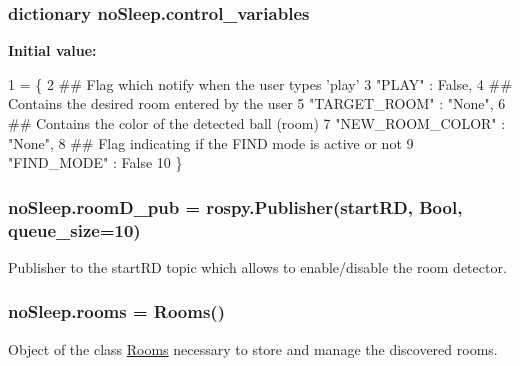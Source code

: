 \subsubsection[{\texorpdfstring{control\+\_\+variables}{control_variables}}]{\setlength{\rightskip}{0pt plus 5cm}dictionary no\+Sleep.\+control\+\_\+variables}\hypertarget{namespacenoSleep_adbe81123b7abf75f19b461e802380fc1}{}\label{namespacenoSleep_adbe81123b7abf75f19b461e802380fc1}
{\bfseries Initial value\+:}
\begin{DoxyCode}
1 = \{
2     \textcolor{comment}{## Flag which notify when the user types 'play'}
3     \textcolor{stringliteral}{"PLAY"} : \textcolor{keyword}{False},
4     \textcolor{comment}{## Contains the desired room entered by the user }
5     \textcolor{stringliteral}{"TARGET\_ROOM"} : \textcolor{stringliteral}{"None"},
6     \textcolor{comment}{## Contains the color of the detected ball (room) }
7     \textcolor{stringliteral}{"NEW\_ROOM\_COLOR"} : \textcolor{stringliteral}{"None"},
8     \textcolor{comment}{## Flag indicating if the FIND mode is active or not }
9     \textcolor{stringliteral}{"FIND\_MODE"} : \textcolor{keyword}{False}   
10 \}
\end{DoxyCode}
\subsubsection[{\texorpdfstring{room\+D\+\_\+pub}{roomD_pub}}]{\setlength{\rightskip}{0pt plus 5cm}no\+Sleep.\+room\+D\+\_\+pub = rospy.\+Publisher(\textquotesingle{}start\+RD\textquotesingle{}, Bool, queue\+\_\+size=10)}\hypertarget{namespacenoSleep_a9556e14c4f96e9bd3a98d6313f1c971b}{}\label{namespacenoSleep_a9556e14c4f96e9bd3a98d6313f1c971b}


Publisher to the start\+RD topic which allows to enable/disable the room detector. 

\subsubsection[{\texorpdfstring{rooms}{rooms}}]{\setlength{\rightskip}{0pt plus 5cm}no\+Sleep.\+rooms = {\bf Rooms}()}\hypertarget{namespacenoSleep_a5d68f48fa901f367ed63cd1e4ac1aef9}{}\label{namespacenoSleep_a5d68f48fa901f367ed63cd1e4ac1aef9}


Object of the class \hyperlink{namespaceRooms}{Rooms} necessary to store and manage the discovered rooms. 

